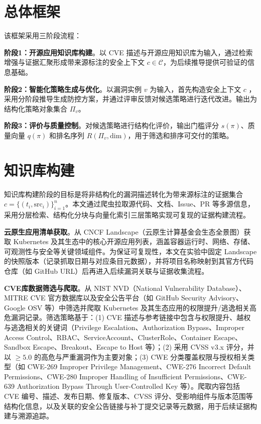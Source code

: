 \section{总体框架}

该框架采用三阶段流程：

	\textbf{阶段1：开源应用知识库构建}。以 CVE 描述与开源应用知识库为输入，通过检索增强与证据汇聚形成带来源标注的安全上下文 $c\in\mathcal{C}$，为后续推导提供可验证的信息基础。

    \textbf{阶段2：智能化策略生成与优化}。以漏洞实例 $v$ 为输入，首先构造安全上下文 $c$ ，采用分阶段推导生成防控方案，并通过评审反馈对候选策略进行迭代改进。输出为结构化策略对象集合 $\Pi_v$。

    \textbf{阶段3：评价与质量控制}。对候选策略进行结构化评价，输出门槛评分 $s(\pi)$、质量向量 $q(\pi)$ 和排名序列 $R(\Pi_v,\text{dim})$，用于筛选和排序可交付的策略。

\section{知识库构建}

知识库构建阶段的目标是将非结构化的漏洞描述转化为带来源标注的证据集合 $c=\{(t_i,\text{src}_i)\}_{i=1}^{n}$。本文通过爬虫拉取源代码、文档、Issue、PR 等多源信息，采用分层检索、结构化分块与向量化索引三层策略实现可复现的证据构建流程。

    {\bfseries 云原生应用清单获取}。从 CNCF Landscape（云原生计算基金会生态全景图）获取 Kubernetes 及其生态中的核心开源应用列表，涵盖容器运行时、网络、存储、可观测性与安全等关键领域组件。为保证可复现性，本文在实验中固定 Landscape 的快照版本（记录抓取日期与对应条目元数据），并将项目名称映射到其官方代码仓库（如 GitHub URL）后再进入后续漏洞关联与证据收集流程。

    {\bfseries CVE库数据筛选与爬取}。从 NIST NVD（National Vulnerability Database）、MITRE CVE 官方数据库以及安全公告平台（如 GitHub Security Advisory、Google OSV 等）中筛选并爬取 Kubernetes 及其生态应用的权限提升/逃逸相关高危漏洞记录。筛选策略基于：(1) CVE 描述与参考链接中包含与权限提升、越权与逃逸相关的关键词（Privilege Escalation、Authorization Bypass、Improper Access Control、RBAC、ServiceAccount、ClusterRole、Container Escape、Sandbox Escape、Breakout、Escape to Host 等）；(2) 采用 CVSS v3.x 评分，并以 $\geq 5.0$ 的高危与严重漏洞作为主要对象；(3) CWE 分类覆盖权限与授权相关类型（如 CWE-269 Improper Privilege Management、CWE-276 Incorrect Default Permissions、CWE-280 Improper Handling of Insufficient Permissions、CWE-639 Authorization Bypass Through User-Controlled Key 等）。爬取内容包括 CVE 编号、描述、发布日期、修复版本、CVSS 评分、受影响组件与版本范围等结构化信息，以及关联的安全公告链接与补丁提交记录等元数据，用于后续证据构建与溯源追踪。

